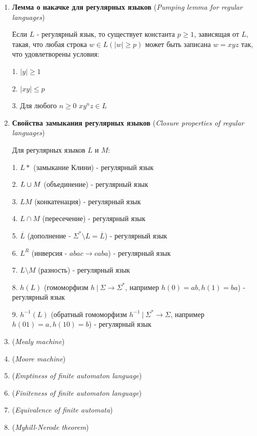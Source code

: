 \documentclass[12pt]{article}
\begin{document}
\begin{enumerate}
        \item \textbf{Лемма о накачке для регулярных языков} (\textit{Pumping lemma for regular languages})

        Если $L$ - регулярный язык, то существует константа $p \geq 1$, зависящая от $L$, такая, что любая строка $w \in L (|w| \geq p)$
        может быть записана $w = xyz$ так, что удовлетворены условия:

        1. $|y| \geq 1$

        2. $|xy| \leq p$

        3. Для любого $n \geq 0$ $xy^n z \in L$

        \item \textbf{Свойства замыкания регулярных языков} (\textit{Closure properties of regular languages})

        Для регулярных языков $L$ и $M$:

        1. $L*$ (замыкание Клини) - регулярный язык

        2. $L \cup M$ (объединение) - регулярный язык

        3. $LM$ (конкатенация) - регулярный язык

        4. $L \cap M$ (пересечение) - регулярный язык

        5. $\overline{L}$ (дополнение - $\Sigma^* \setminus L = \overline{L}$) - регулярный язык

        6. $L^R$ (инверсия - $abac \to caba$) - регулярный язык

        7. $L \setminus M$ (разность) - регулярный язык

        8. $h(L)$ (гомоморфизм $h \ | \ \Sigma \to \Sigma^*$, например $h(0) = ab, h(1) = ba$) - регулярный язык

        9. $h^{-1}(L)$ (обратный гомоморфизм $h^{-1} \ | \ \Sigma^* \to \Sigma$, например $h(01) = a, h(10) = b$) - регулярный язык

        \item \textbf{} (\textit{Mealy machine})

        \item \textbf{} (\textit{Moore machine})

        \item \textbf{} (\textit{Emptiness of finite automaton language})

        \item \textbf{} (\textit{Finiteness of finite automaton language})

        \item \textbf{} (\textit{Equivalence of finite automata})

        \item \textbf{} (\textit{Myhill-Nerode theorem})

    \end{enumerate}
\end{document}
